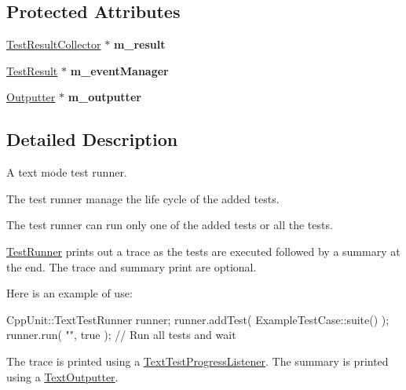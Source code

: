 \subsection*{Protected Attributes}
\begin{DoxyCompactItemize}
\item 
\hypertarget{class_text_test_runner_a0fe03f0ddb56d68ed478bb807cff08c8}{\hyperlink{class_test_result_collector}{Test\+Result\+Collector} $\ast$ {\bfseries m\+\_\+result}}\label{class_text_test_runner_a0fe03f0ddb56d68ed478bb807cff08c8}

\item 
\hypertarget{class_text_test_runner_a5d9bedab3a84ef32944697f102689387}{\hyperlink{class_test_result}{Test\+Result} $\ast$ {\bfseries m\+\_\+event\+Manager}}\label{class_text_test_runner_a5d9bedab3a84ef32944697f102689387}

\item 
\hypertarget{class_text_test_runner_abf21b88df7770bb5e7279ffcb8b2802a}{\hyperlink{class_outputter}{Outputter} $\ast$ {\bfseries m\+\_\+outputter}}\label{class_text_test_runner_abf21b88df7770bb5e7279ffcb8b2802a}

\end{DoxyCompactItemize}


\subsection{Detailed Description}
A text mode test runner.

The test runner manage the life cycle of the added tests. 

The test runner can run only one of the added tests or all the tests.

\hyperlink{class_test_runner}{Test\+Runner} prints out a trace as the tests are executed followed by a summary at the end. The trace and summary print are optional.

Here is an example of use\+:


\begin{DoxyCode}
CppUnit::TextTestRunner runner;
runner.addTest( ExampleTestCase::suite() );
runner.run( \textcolor{stringliteral}{""}, \textcolor{keyword}{true} );    \textcolor{comment}{// Run all tests and wait}
\end{DoxyCode}


The trace is printed using a \hyperlink{class_text_test_progress_listener}{Text\+Test\+Progress\+Listener}. The summary is printed using a \hyperlink{class_text_outputter}{Text\+Outputter}.

